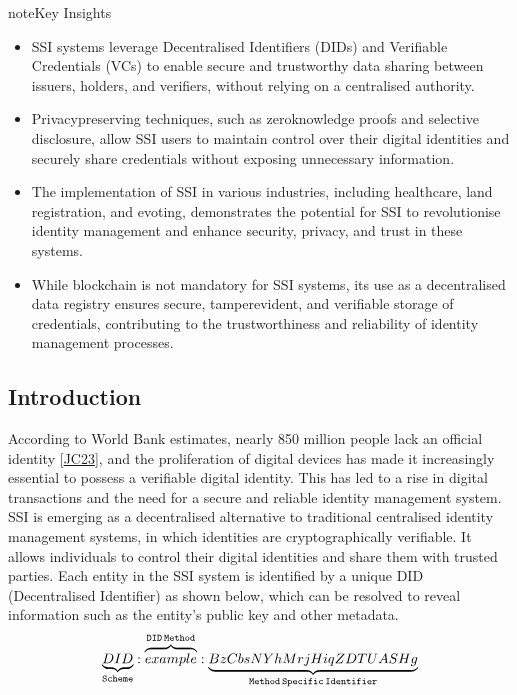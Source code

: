 \documentclass[letterpaper,10pt,english]{jupyterBook}
\begin{document}
\begin{sphinxadmonition}{note}{Key Insights}
\begin{itemize}
\item {} 
\sphinxAtStartPar
SSI systems leverage Decentralised Identifiers (DIDs) and Verifiable Credentials (VCs) to enable secure and trustworthy data sharing between issuers, holders, and verifiers, without relying on a centralised authority.

\item {} 
\sphinxAtStartPar
Privacy\sphinxhyphen{}preserving techniques, such as zero\sphinxhyphen{}knowledge proofs and selective disclosure, allow SSI users to maintain control over their digital identities and securely share credentials without exposing unnecessary information.

\item {} 
\sphinxAtStartPar
The implementation of SSI in various industries, including healthcare, land registration, and e\sphinxhyphen{}voting, demonstrates the potential for SSI to revolutionise identity management and enhance security, privacy, and trust in these systems.

\item {} 
\sphinxAtStartPar
While blockchain is not mandatory for SSI systems, its use as a decentralised data registry ensures secure, tamper\sphinxhyphen{}evident, and verifiable storage of credentials, contributing to the trustworthiness and reliability of identity management processes.

\end{itemize}
\end{sphinxadmonition}


\subsection{Introduction}
\label{\detokenize{SSI/ssi:introduction}}
\sphinxAtStartPar
According to World Bank estimates, nearly 850 million people lack an official identity {[}\hyperlink{cite.SSI/ssi:id58}{JC23}{]}, and the proliferation of digital devices has made it increasingly essential to possess a verifiable digital identity. This has led to a rise in digital transactions and the need for a secure and reliable identity management system. SSI is emerging as a decentralised alternative to traditional centralised identity management systems, in which identities are cryptographically verifiable. It allows individuals to control their digital identities and share them with trusted parties. Each entity in the SSI system is identified by a unique DID (Decentralised Identifier) as shown below, which can be resolved to reveal information such as the entity’s public key and other metadata.
\begin{equation*}
\begin{split}
{\tt \underbrace{DID}_{Scheme}: \overbrace{example}^{DID \, Method}:\underbrace{BzCbsNYhMrjHiqZDTUASHg}_{Method \, Specific \, Identifier}} \label{eq1}
\end{split}
\end{equation*}
\end{document}
